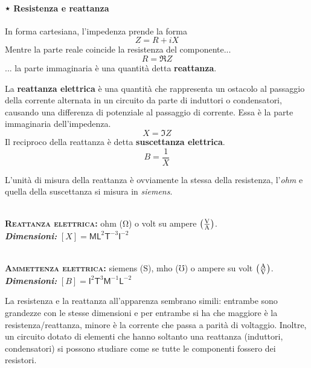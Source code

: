 \paragraph{⋆ Resistenza e reattanza}
In forma cartesiana, l'impedenza prende la forma
\begin{equation}
	Z=R+iX
\end{equation}
Mentre la parte reale coincide la resistenza del componente...
\begin{equation}
	R=\Re Z
\end{equation}
... la parte immaginaria è una quantità detta \textbf{reattanza}.
\begin{define}[Reattanza]
	La \textbf{reattanza elettrica} è una quantità che rappresenta un ostacolo al passaggio della corrente alternata in un circuito da parte di induttori o condensatori, causando una differenza di potenziale al passaggio di corrente. Essa è la parte immaginaria dell'impedenza.
	\begin{equation}
		X=\Im Z
	\end{equation}
	Il reciproco della reattanza è detta \textbf{suscettanza elettrica}.
	\begin{equation}
		B=\frac{1}{X}
	\end{equation}
\end{define}
L'unità di misura della reattanza è ovviamente la stessa della resistenza, l'\textit{ohm} e quella della suscettanza si misura in \textit{siemens}.
\begin{units}~\\
	\textbf{\textsc{Reattanza elettrica:}} ohm ($\unit{\ohm}$) o volt su ampere $\left(\unit[per-mode = fraction]{\volt\per\ampere}\right)$.\\
	\textit{\textbf{Dimensioni:}} $[X]=\mathsf{M} \mathsf{L}^2  \mathsf{T}^{-3}\mathsf{I}^{-2}$
\end{units}
\begin{units}~\\
	\textbf{\textsc{Ammettenza elettrica:}} siemens ($\unit{\siemens}$), mho  ($\mho$) o ampere su volt $\left(\unit[per-mode = fraction]{\ampere\per\volt}\right)$.\\
	\textit{\textbf{Dimensioni:}} $[B]=\mathsf{I}^{2}\mathsf{T}^{3}\mathsf{M}^{-1} \mathsf{L}^{-2}$
\end{units}
\noindent La resistenza e la reattanza all'apparenza sembrano simili: entrambe sono grandezze con le stesse dimensioni e per entrambe si ha che maggiore è la resistenza/reattanza, minore è la corrente che passa a parità di voltaggio. Inoltre, un circuito dotato di elementi che hanno soltanto una reattanza (induttori, condensatori) si possono studiare come se tutte le componenti fossero dei resistori.

